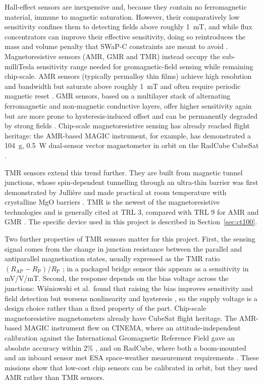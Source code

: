 \documentclass[12pt,a4paper]{article}
\begin{document}
Hall-effect sensors are inexpensive and, because they contain no ferromagnetic material, immune to magnetic saturation. However, their comparatively low sensitivity confines them to detecting fields above roughly \SI{1}{\milli\tesla}, and while flux concentrators can improve their effective sensitivity, doing so reintroduces the mass and volume penalty that SWaP-C constraints are meant to avoid \cite{amr-gmr-hall-bridging}. Magnetoresistive sensors (AMR, GMR and TMR) instead occupy the sub-milliTesla sensitivity range needed for geomagnetic-field sensing while remaining chip-scale. AMR sensors (typically permalloy thin films) achieve high resolution and bandwidth but saturate above roughly \SI{1}{\milli\tesla} and often require periodic magnetic reset \cite{amr-gmr-hall-bridging}. GMR sensors, based on a multilayer stack of alternating ferromagnetic and non-magnetic conductive layers, offer higher sensitivity again but are more prone to hysteresis-induced offset and can be permanently degraded by strong fields \cite{amr-gmr-hall-bridging}. Chip-scale magnetoresistive sensing has already reached flight heritage: the AMR-based MAGIC instrument, for example, has demonstrated a \SI{104}{\gram}, \SI{0.5}{\watt} dual-sensor vector magnetometer in orbit on the RadCube CubeSat \cite{magic-radcube}.

TMR sensors extend this trend further. They are built from magnetic tunnel junctions, whose spin-dependent tunnelling through an ultra-thin barrier was first demonstrated by Julli\`ere \cite{julliere1975} and made practical at room temperature with crystalline MgO barriers \cite{parkin2004,yuasa2004}. TMR is the newest of the magnetoresistive technologies and is generally cited at TRL 3, compared with TRL 9 for AMR and GMR \cite{alves-thesis}. The specific device used in this project is described in Section~\ref{sec:ct100}.

Two further properties of TMR sensors matter for this project. First, the sensing signal comes from the change in junction resistance between the parallel and antiparallel magnetisation states, usually expressed as the TMR ratio $(R_{\text{AP}} - R_{\text{P}})/R_{\text{P}}$ \cite{julliere1975}; in a packaged bridge sensor this appears as a sensitivity in mV/V/mT. Second, the response depends on the bias voltage across the junctions: Wi\'sniowski et al.\ found that raising the bias improves sensitivity and field detection but worsens nonlinearity and hysteresis \cite{wisniowski2021}, so the supply voltage is a design choice rather than a fixed property of the part. Chip-scale magnetoresistive magnetometers already have CubeSat flight heritage. The AMR-based MAGIC instrument flew on CINEMA, where an attitude-independent calibration against the International Geomagnetic Reference Field gave an absolute accuracy within 2\% \cite{archer2015}, and on RadCube, where both a boom-mounted and an inboard sensor met ESA space-weather measurement requirements \cite{magic-radcube}. These missions show that low-cost chip sensors can be calibrated in orbit, but they used AMR rather than TMR sensors.
\end{document}
